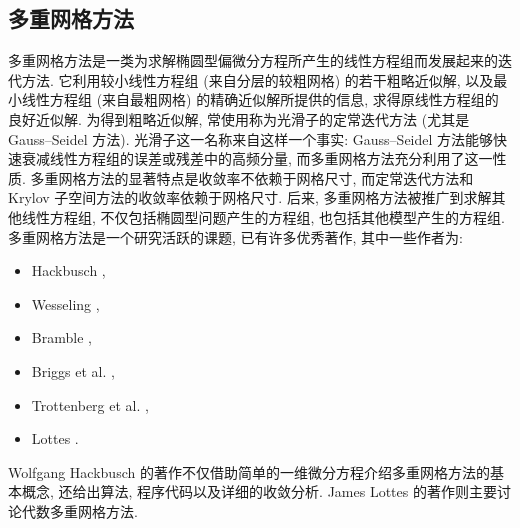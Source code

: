 \subsection{{多重网格方法}}\label{sec:multigrid-methods}
{\leavevmode{}\label{idx:chapter-01-section-07:multigrid-principle}多重网格方法是一类为求解椭圆型偏微分方程所产生的线性方程组而发展起来的迭代方法. 它利用较小线性方程组 (来自分层的较粗网格) 的若干粗略近似解, 以及最小线性方程组 (来自最粗网格) 的精确近似解所提供的信息, 求得原线性方程组的良好近似解. 为得到粗略近似解, 常使用称为光滑子的定常迭代方法 (尤其是 Gauss--Seidel 方法). 光滑子这一名称来自这样一个事实: Gauss--Seidel 方法能够快速衰减线性方程组的误差或残差中的高频分量, 而多重网格方法充分利用了这一性质.}
{多重网格方法的显著特点是收敛率不依赖于网格尺寸, 而定常迭代方法和 Krylov 子空间方法的收敛率依赖于网格尺寸. 后来, 多重网格方法被推广到求解其他线性方程组, 不仅包括椭圆型问题产生的方程组, 也包括其他模型产生的方程组.}
{多重网格方法是一个研究活跃的课题, 已有许多优秀著作, 其中一些作者为:}
\begin{itemize}
\item Hackbusch ,
\item Wesseling ,
\item Bramble ,
\item Briggs et al. ,
\item Trottenberg et al. ,
\item Lottes .
\end{itemize}
{Wolfgang Hackbusch 的著作不仅借助简单的一维微分方程介绍多重网格方法的基本概念, 还给出算法, 程序代码以及详细的收敛分析. James Lottes 的著作则主要讨论代数多重网格方法.}
